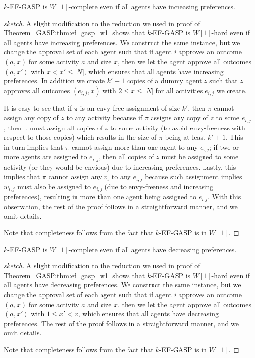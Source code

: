 \begin{theorem}
$k$-EF-GASP is $W[1]$-complete even if all agents have increasing preferences.
\end{theorem}
\begin{proof}[sketch]
	A slight modification to the reduction we used in proof of Theorem~\ref{GASP:thm:ef_gasp_w1} shows that $k$-EF-GASP is $W[1]$-hard even if all agents have increasing preferences. 
	We construct the same instance, but we change the approval set of each agent such that if agent $i$ approves an outcome $(a, x)$ for some activity $a$ and size $x$, then we let the agent approve all outcomes $(a, x')$ with $x < x' \leq |N|$, which ensures that all agents have increasing preferences.
	In addition we create $k'+1$ copies of a dummy agent $z$ such that $z$ approves all outcomes $(e_{i,j}, x)$ with $2 \leq x \leq |N|$ for all activities $e_{i,j}$ we create. 
	
	It is easy to see that if $\pi$ is an envy-free assignment of size $k'$, then $\pi$ cannot assign any copy of $z$ to any activity because if $\pi$ assigns any copy of $z$ to some $e_{i,j}$, then $\pi$ must assign all copies of $z$ to some activity (to avoid envy-freeness with respect to those copies) which results in the size of $\pi$ being at least $k'+1$. 
	This in turn implies that $\pi$ cannot assign more than one agent to any $e_{i,j}$; if two or more agents are assigned to $e_{i,j}$, then all copies of $z$ must be assigned to some activity (or they would be envious) due to increasing preferences. Lastly, this implies that $\pi$ cannot assign any $v_i$ to any $e_{i,j}$ because such assignment implies $w_{i,j}$ must also be assigned to $e_{i,j}$ (due to envy-freeness and increasing preferences), resulting in more than one agent being assigned to $e_{i,j}$. With this observation, the rest of the proof follows in a straightforward manner, and we omit details. 
	
	Note that completeness follows from the fact that $k$-EF-GASP is in $W[1]$.
\end{proof}


\begin{theorem}
$k$-EF-GASP is $W[1]$-complete even if all agents have decreasing preferences.
\end{theorem}
\begin{proof}[sketch]
	A slight modification to the reduction we used in proof of Theorem~\ref{GASP:thm:ef_gasp_w1} shows that $k$-EF-GASP is $W[1]$-hard even if all agents have decreasing preferences. We construct the same instance, but we change the approval set of each agent such that if agent $i$ approves an outcome $(a, x)$ for some activity $a$ and size $x$, then we let the agent approve all outcomes $(a, x')$ with $1 \leq x' < x$, which ensures that all agents have decreasing preferences. The rest of the proof follows in a straightforward manner, and we omit details.
	
	Note that completeness follows from the fact that $k$-EF-GASP is in $W[1]$.
\end{proof}

